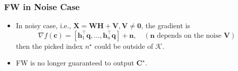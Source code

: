 \documentclass[10pt,xcolor={usenames,dvipsnames,table}]{beamer}
\newcommand{\T}{\!\top\!}
\begin{document}
\begin{frame}
    \frametitle{FW in Noise Case}
        
    \begin{itemize}
        \item In noisy case, i.e., $\bm{X} = \bm{W}\bm{H} + \bm{V}, \bm{V} \neq \bm{0}$,
  the gradient is
  \[
      \nabla f(\bm{c}) = [\bm{h}_1^{\T}\bm{q}, \ldots , \bm{h}_n^{\T}\bm{q}] + \bm{n}, \quad ( \bm{n} \text{ depends on the noise $\bm{V}$})
  \] 
  then the picked index $n^{\star}$ could be outside of $\mathcal{K}$.
\item FW is no longer guaranteed to output $\bm{C}^{\star}$.
    \end{itemize}


\end{frame}
\end{document}
